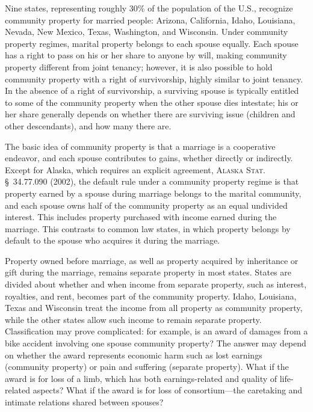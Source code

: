 Nine states, representing roughly 30\% of the population of the U.S., recognize
community property for married people: Arizona, California, Idaho, Louisiana,
Nevada, New Mexico, Texas, Washington, and Wisconsin. Under community property
regimes, marital property belongs to each spouse equally. Each spouse has a
right to pass on his or her share to anyone by will, making community property
different from joint tenancy; however, it is also possible to hold community
property with a right of survivorship, highly similar to joint tenancy. In the
absence of a right of survivorship, a surviving spouse is typically entitled to
some of the community property when the other spouse dies intestate; his or her
share generally depends on whether there are surviving issue (children and
other descendants), and how many there are.

The basic idea of community property is that a marriage is a cooperative
endeavor, and each spouse contributes to gains, whether directly or indirectly.
Except for Alaska, which requires an explicit agreement, \textsc{Alaska Stat.} \S~34.77.090 (2002), the default rule under a community property regime is that
property earned by a spouse during marriage belongs to the marital community,
and each spouse owns half of the community property as an equal undivided
interest. This includes property purchased with income earned during the
marriage. This contrasts to common law states, in which property belongs by
default to the spouse who acquires it during the marriage.

Property owned before marriage, as well as property acquired by inheritance or
gift during the marriage, remains separate property in most states. States are
divided about whether and when income from separate property, such as interest,
royalties, and rent, becomes part of the community property. Idaho, Louisiana,
Texas and Wisconsin treat the income from all property as community property,
while the other states allow such income to remain separate property.
Classification may prove complicated: for example, is an award of damages from
a bike accident involving one spouse community property? The answer may depend
on whether the award represents economic harm such as lost earnings (community
property) or pain and suffering (separate property). What if the award is for
loss of a limb, which has both earnings-related and quality of life-related
aspects? What if the award is for loss of consortium---the caretaking and
intimate relations shared between spouses?

